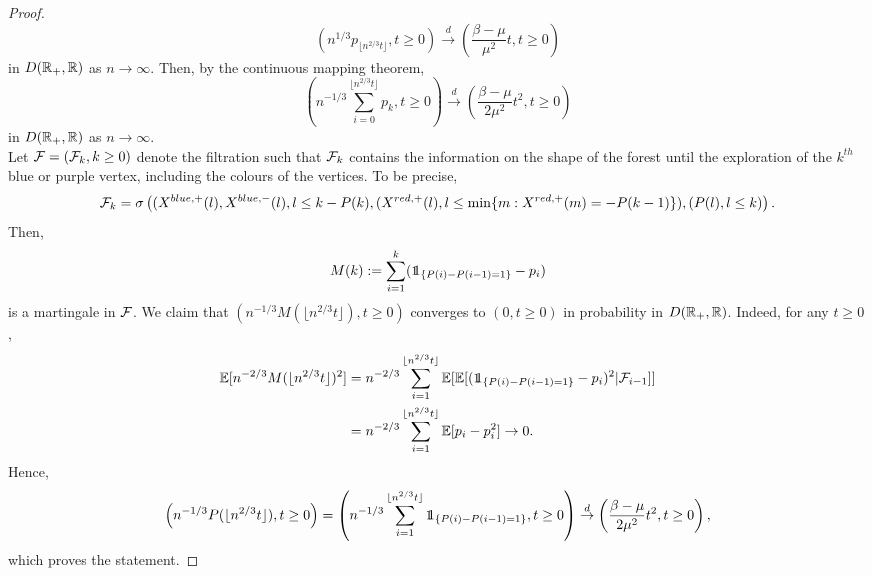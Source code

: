 \begin{proof}
\begin{equation}\label{eq.convergenceprob}\left(n^{1/3}p_{\lfloor n^{2/3} t \rfloor},t\geq 0\right)\overset{d}{\to} \left(\frac{\beta-\mu}{\mu^2}t,t\geq 0\right)\end{equation}
in $D({\mathbb R}_+,{\mathbb R})$ as $n\to \infty$. 
Then, by the continuous mapping theorem,
$$\left(n^{-1/3}\sum_{i=0}^{\lfloor n^{2/3}t \rfloor} p_k , t \geq 0\right)\overset{d}{\to} \left(\frac{\beta-\mu}{2\mu^2}t^2,t\geq 0\right)$$
in $D({\mathbb R}_+,{\mathbb R})$ as $n\to \infty$. \\
Let ${\mathcal F}=({\mathcal F}_k,k\geq 0)$ denote the filtration such that ${\mathcal F}_{k}$ contains the information on the shape of the forest until the exploration of the $k^{th}$ blue or purple vertex, including the colours of the vertices. To be precise,
$${\mathcal F}_k=\sigma\left((X^{blue,+}(l),X^{blue,-}(l), l\leq k-P(k),(X^{red,+}(l),l\leq \min\{m:X^{red,+}(m)=-P(k-1)\}), (P(l),l\leq k)\right).$$ Then, 
$$M(k):=\sum_{i=1}^k (\one_{\{P(i)-P(i-1)=1\}}-p_i)$$ is a martingale in ${\mathcal F}$. We claim that $(n^{-1/3}M(\lfloor n^{2/3} t\rfloor ), t\geq 0)$ converges to $(0,t\geq 0)$ in probability in $D({\mathbb R}_+,{\mathbb R})$. Indeed, for any $t\geq 0$,
\begin{align*}\E[n^{-2/3}M(\lfloor n^{2/3} t\rfloor )^2]&=n^{-2/3}\sum_{i=1}^{\lfloor n^{2/3} t\rfloor} \E[\E[(\one_{\{P(i)-P(i-1)=1\}}-p_i)^2|\cF_{i-1}]]\\&=n^{-2/3}\sum_{i=1}^{\lfloor n^{2/3} t\rfloor} \E[p_i-p_i^2]\to 0.\end{align*}
Hence,
$$\left(n^{-1/3}P(\lfloor n^{2/3}t\rfloor), t\geq 0\right)=\left(n^{-1/3}\sum_{i=1}^{\lfloor n^{2/3}t\rfloor}  \one_{\{P(i)-P(i-1)=1\}}  , t\geq 0\right)\overset{d}{\to} \left(\frac{\beta - \mu}{2\mu^2} t^2, t\geq 0 \right),$$
 which proves the statement.

\end{proof}\\

